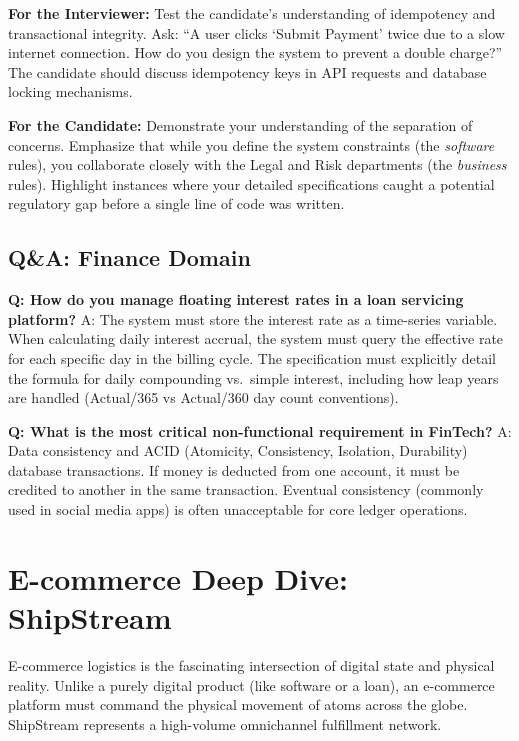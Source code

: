 \documentclass[
  11pt,
  openany,
  oneside]{book}
\renewenvironment{quote}{\begin{customquote}}{\end{customquote}}
\begin{document}
\begin{quote}
\textbf{For the Interviewer:} Test the candidate's understanding of
idempotency and transactional integrity. Ask: ``A user clicks `Submit
Payment' twice due to a slow internet connection. How do you design the
system to prevent a double charge?'' The candidate should discuss
idempotency keys in API requests and database locking mechanisms.
\end{quote}

\begin{quote}
\textbf{For the Candidate:} Demonstrate your understanding of the
separation of concerns. Emphasize that while you define the system
constraints (the \emph{software} rules), you collaborate closely with
the Legal and Risk departments (the \emph{business} rules). Highlight
instances where your detailed specifications caught a potential
regulatory gap before a single line of code was written.
\end{quote}

\subsection{Q\&A: Finance Domain}\label{qa-finance-domain}

\textbf{Q: How do you manage floating interest rates in a loan servicing
platform?} A: The system must store the interest rate as a time-series
variable. When calculating daily interest accrual, the system must query
the effective rate for each specific day in the billing cycle. The
specification must explicitly detail the formula for daily compounding
vs.~simple interest, including how leap years are handled (Actual/365 vs
Actual/360 day count conventions).

\textbf{Q: What is the most critical non-functional requirement in
FinTech?} A: Data consistency and ACID (Atomicity, Consistency,
Isolation, Durability) database transactions. If money is deducted from
one account, it must be credited to another in the same transaction.
Eventual consistency (commonly used in social media apps) is often
unacceptable for core ledger operations.

\bigskip

\section{E-commerce Deep Dive:
ShipStream}\label{e-commerce-deep-dive-shipstream}

E-commerce logistics is the fascinating intersection of digital state
and physical reality. Unlike a purely digital product (like software or
a loan), an e-commerce platform must command the physical movement of
atoms across the globe. ShipStream represents a high-volume omnichannel
fulfillment network.
\end{document}
